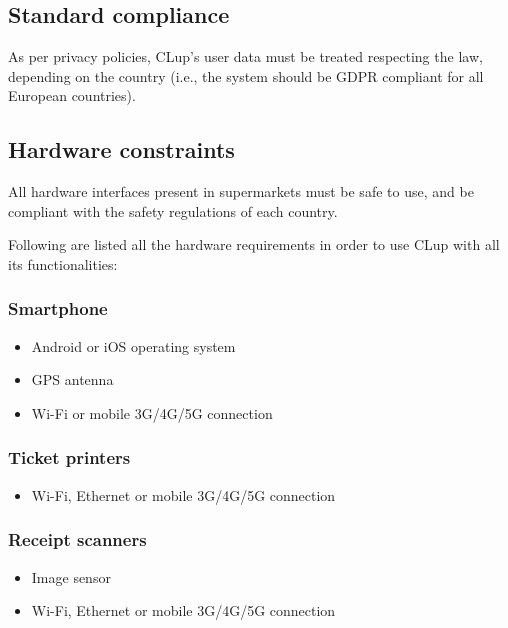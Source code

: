 \documentclass[../../main.tex]{subfiles}
\begin{document}
	\subsection{Standard compliance}

	As per privacy policies, CLup's user data must be treated respecting the law, depending on the 
	country (i.e., the system should be GDPR compliant for all European countries).

	\subsection{Hardware constraints}

	All hardware interfaces present in supermarkets must be safe to use, and be compliant with the safety regulations of each country.

	Following are listed all the hardware requirements in order to use CLup with all its functionalities:

	\subsubsection*{Smartphone}
	\begin{itemize}

		\item Android or iOS operating system

		\item GPS antenna

		\item Wi-Fi or mobile 3G/4G/5G connection

	\end{itemize}

	\subsubsection*{Ticket printers}
	\begin{itemize}

		\item Wi-Fi, Ethernet or mobile 3G/4G/5G connection

	\end{itemize}

	\subsubsection*{Receipt scanners}
	\begin{itemize}

		\item Image sensor

		\item Wi-Fi, Ethernet or mobile 3G/4G/5G connection

	\end{itemize}
	
\end{document}
